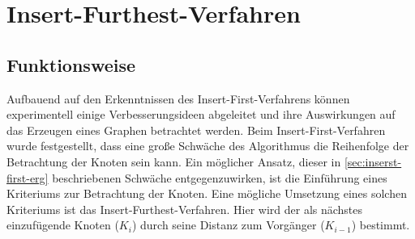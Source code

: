 \section{Insert-Furthest-Verfahren} \label{sec:insert-furthest-verfahren}
\subsection{Funktionsweise} \label{sec:insert-furthest-funkt}
Aufbauend auf den Erkenntnissen des Insert-First-Verfahrens können experimentell einige Verbesserungsideen abgeleitet und ihre Auswirkungen auf das Erzeugen eines Graphen betrachtet werden.
Beim Insert-First-Verfahren wurde festgestellt, dass eine große Schwäche des Algorithmus die Reihenfolge der Betrachtung der Knoten sein kann.
Ein möglicher Ansatz, dieser in \vref{sec:inserst-first-erg} beschriebenen Schwäche entgegenzuwirken, ist die Einführung eines Kriteriums zur Betrachtung der Knoten.
Eine mögliche Umsetzung eines solchen Kriteriums ist das Insert-Furthest-Verfahren. 
Hier wird der als nächstes einzufügende Knoten ($K_i$) durch seine Distanz zum Vorgänger ($K_{i-1}$) bestimmt.


